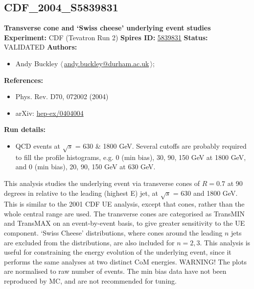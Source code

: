 \subsection[CDF\_2004\_S5839831]{CDF\_2004\_S5839831\,\cite{Acosta:2004wqa}}
\textbf{Transverse cone and `Swiss cheese' underlying event studies}\newline
\textbf{Experiment:} CDF (Tevatron Run 2) \newline
\textbf{Spires ID:} \href{http://www.slac.stanford.edu/spires/find/hep/www?rawcmd=key+5839831}{5839831}\newline
\textbf{Status:} VALIDATED\newline
\textbf{Authors:}
\begin{itemize}
  \item Andy Buckley $\langle\,$\href{mailto:andy.buckley@durham.ac.uk}{andy.buckley@durham.ac.uk}$\,\rangle$;
\end{itemize}
\textbf{References:}
\begin{itemize}
  \item Phys. Rev. D70, 072002 (2004)
  \item arXiv: \href{http://arxiv.org/abs/hep-ex/0404004}{hep-ex/0404004}
\end{itemize}
\textbf{Run details:}
\begin{itemize}

  \item QCD events at \ensuremath{\sqrt{s}} = 630 \& 1800 GeV. Several \pTmin cutoffs are probably required to fill the profile histograms, e.g. 0 (min bias), 30, 90, 150 GeV at 1800 GeV, and 0 (min bias), 20, 90,  150 GeV at 630 GeV.\end{itemize}

\noindent This analysis studies the underlying event via transverse cones of  $R = 0.7$ at 90 degrees in \phi relative to the leading (highest E) jet, at \ensuremath{\sqrt{s}} = 630 and 1800 GeV. This is similar to the 2001 CDF UE analysis, except that cones, rather than the whole central \eta range are used. The transverse cones are categorised as TransMIN and TransMAX on an event-by-event basis, to give greater sensitivity to the UE component.
`Swiss Cheese' distributions, where cones around the leading $n$ jets are excluded from the distributions, are also included for $n = 2, 3$.  This analysis is useful for constraining the energy evolution of the underlying event, since it performs the same analyses at two distinct CoM energies.
WARNING! The \pT plots are normalised to raw number of events. The min bias data have not been reproduced by MC, and are not recommended for tuning.


